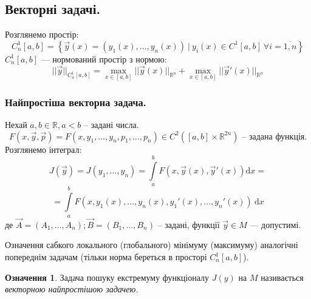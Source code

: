 \documentclass[14pt,a4paper]{scrartcl}
\theoremstyle{definition}
\newtheorem*{defo}{Означення}
\theoremstyle{definition}
\theoremstyle{definition}
\begin{document}
\subsection{Векторні задачі.}
Розглянемо простір:
$$
C_n^1[a,b] = \left\lbrace \overrightarrow{y} (x) = (y_1(x), \dots , y_n(x)) \ \bigg| \  y_i(x) \in C^1[a,b] \ \forall i = \overline{1, n} \right\rbrace
$$
$
C_n^1 [a,b]
$ --- нормований простір з нормою:
$$
||\overrightarrow{y}||_{C_n^1 [a,b] } = \max\limits_{x\in[a,b]}||\overrightarrow{y}(x)||_{\mathbb{R}^n} +
 \max\limits_{x\in[a,b]}||\overrightarrow{y}'(x)||_{\mathbb{R}^n}
$$
\subsubsection{Найпростіша векторна задача.}
Нехай $a,b \in \mathbb{R} , a < b$ -- задані числа.
$$
F(x, \overrightarrow{y}, \overrightarrow{p}) = F(x, y_1, \dots, y_n, p_1, \dots, p_n)\in C^2 ([a,b] \times \mathbb{R}^{2n}) \text{ -- задана функція.}
$$
Розглянемо інтеграл:
$$
J(\overrightarrow{y}) = J(y_1, \dots, y_n) =  \int\limits_{a}^{b}{F(x,\overrightarrow{y}(x), \overrightarrow{y}'(x)) \mathrm{d} x} =
$$
$$
=  \int\limits_{a}^{ b}{ F(x, y_1 (x), \dots, y_n(x), y_1'(x), \dots, y_n'(x)) \ \mathrm{d} x}
$$
де $\overrightarrow{A} = (A_1, \dots , A_n) ; \overrightarrow{B} = (B_1, \dots , B_n)$ -- задані, функції $\overrightarrow{y} \in M$ --- допустимі. \par
Означення сабкого локального (глобального) мінімуму (максимуму) аналогічні попереднім задачам (тільки норма береться в просторі $C_n^1[a,b]$).
\begin{defo}
 Задача пошуку екстремуму функціоналу $J(y)$ на $M$ називається \textit{векторною найпростішою задачею.}
\end{defo}
\end{document}
